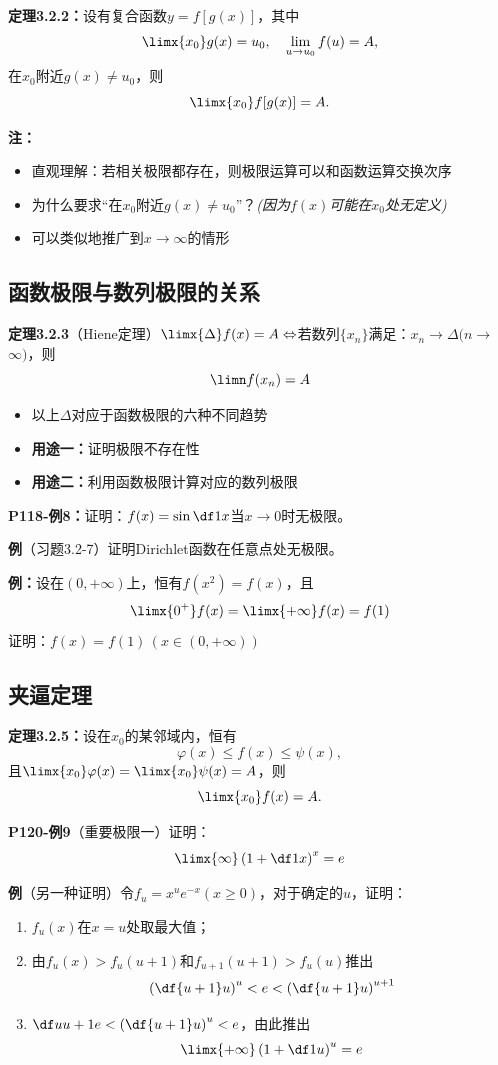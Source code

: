 {\bf 定理3.2.2：}设有复合函数$y=f[g(x)]$，其中
$$\limx{x_0}g(x)=u_0,\quad\lim\limits_{u\to u_0}f(u)=A,$$
在$x_0$附近$g(x)\ne u_0$，则
$$\limx{x_0}f[g(x)]=A.$$

{\bf 注：}
\begin{itemize}
  \setlength{\itemindent}{1cm}
  \item 直观理解：若相关极限都存在，则极限运算可以和函数运算交换次序
  \item 为什么要求“在$x_0$附近$g(x)\ne u_0$”？{\it (因为$f(x)$可能在$x_0$处无定义)}
  \item 可以类似地推广到$x\to\infty$的情形
\end{itemize}

\subsection{函数极限与数列极限的关系}

{\bf 定理3.2.3}（Hiene定理）$\limx{\Delta}f(x)=A\Leftrightarrow
$若数列$\{x_n\}$满足：$x_n\to \Delta(n\to$ $\infty)$，则
$$\limn f(x_n)=A$$

\begin{itemize}
  \setlength{\itemindent}{1cm}
  \item 以上$\Delta$对应于函数极限的六种不同趋势 
  \item {\bf 用途一：}证明极限不存在性
  \item {\bf 用途二：}利用函数极限计算对应的数列极限
\end{itemize}

{\bf P118-例8：}证明：$f(x)=\sin\df 1x$当$x\to 0$时无极限。

{\bf 例}（习题3.2-7）证明Dirichlet函数在任意点处无极限。

{\bf 例：}设在$(0,+\infty)$上，恒有$f(x^2)=f(x)$，且
$$\limx{0^+}f(x)=\limx{+\infty}f(x)=f(1)$$
证明：$f(x)=f(1)\,(x\in(0,+\infty))$

\subsection{夹逼定理}

{\bf 定理3.2.5：}设在$x_0$的某邻域内，恒有
$$\varphi(x)\leq f(x)\leq\psi(x), $$
且$\limx{x_0}\varphi(x)=\limx{x_0}\psi(x)=A$，则
$$\limx{x_0}f(x)=A.$$

{\bf P120-例9}（重要极限一）证明：
$$\limx{\infty}\left(1+\df 1x\right)^x=e$$

\begin{shaded}
{\bf 例}（另一种证明）令$f_u=x^ue^{-x}(x\geq 0)$，对于确定的$u$，证明：
\begin{enumerate}[(1)]
  \setlength{\itemindent}{1cm}
  \item $f_u(x)$在$x=u$处取最大值；
  \item 由$f_u(x)>f_u(u+1)$和$f_{u+1}(u+1)>f_u(u)$推出
  $$\left(\df{u+1}u\right)^u<e<\left(\df{u+1}u\right)^{u+1}$$
  \item $\df u{u+1}e<\left(\df{u+1}u\right)^u<e$，由此推出
  $$\limx{+\infty}\left(1+\df 1u\right)^u=e$$
\end{enumerate}
\end{shaded}

